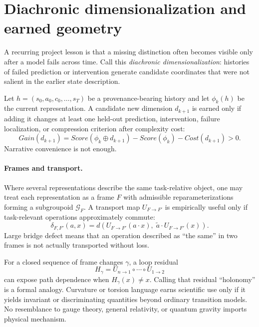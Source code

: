\section{Diachronic dimensionalization and earned geometry}
\label{sec:deep-geometry}

A recurring project lesson is that a missing distinction often becomes visible only after a model fails across time. Call this \emph{diachronic dimensionalization}: histories of failed prediction or intervention generate candidate coordinates that were not salient in the earlier state description.

Let $h=(s_0,a_0,c_0,\ldots,s_T)$ be a provenance-bearing history and let $\phi_k(h)$ be the current representation. A candidate new dimension $d_{k+1}$ is earned only if adding it changes at least one held-out prediction, intervention, failure localization, or compression criterion after complexity cost:
\begin{equation}
Gain(d_{k+1}) = Score(\phi_k\oplus d_{k+1})-Score(\phi_k)-Cost(d_{k+1})>0.
\label{eq:deep-dim-gain}
\end{equation}
Narrative convenience is not enough.

\paragraph{Frames and transport.}
Where several representations describe the same task-relative object, one may treat each representation as a frame $F$ with admissible reparameterizations forming a subgroupoid $\mathcal G_F$. A transport map $U_{F\rightarrow F'}$ is empirically useful only if task-relevant operations approximately commute:
\begin{equation}
\delta_{F,F'}(a,x)
= d\!\left(U_{F\rightarrow F'}(a\cdot x),\;\tilde a\cdot U_{F\rightarrow F'}(x)\right).
\label{eq:deep-bridge-defect}
\end{equation}
Large bridge defect means that an operation described as ``the same'' in two frames is not actually transported without loss.

For a closed sequence of frame changes $\gamma$, a loop residual
\begin{equation}
H_\gamma = U_{n\rightarrow 1}\circ\cdots\circ U_{1\rightarrow 2}
\label{eq:deep-holonomy}
\end{equation}
can expose path dependence when $H_\gamma(x)\neq x$. Calling that residual ``holonomy'' is a formal analogy. Curvature or torsion language earns scientific use only if it yields invariant or discriminating quantities beyond ordinary transition models. No resemblance to gauge theory, general relativity, or quantum gravity imports physical mechanism.

